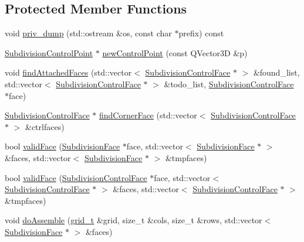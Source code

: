 \subsection*{Protected Member Functions}
\begin{DoxyCompactItemize}
\item 
void \hyperlink{classShipCAD_1_1SubdivisionSurface_a5c88eb988cc6a439242264bc54a6e3e1}{priv\-\_\-dump} (std\-::ostream \&os, const char $\ast$prefix) const 
\item 
\hyperlink{classShipCAD_1_1SubdivisionControlPoint}{Subdivision\-Control\-Point} $\ast$ \hyperlink{classShipCAD_1_1SubdivisionSurface_a251b711125d50aa51875451976e8a8d7}{new\-Control\-Point} (const Q\-Vector3\-D \&p)
\item 
void \hyperlink{classShipCAD_1_1SubdivisionSurface_a3163cfd01e0454ecb9dbb088dc76fbc6}{find\-Attached\-Faces} (std\-::vector$<$ \hyperlink{classShipCAD_1_1SubdivisionControlFace}{Subdivision\-Control\-Face} $\ast$ $>$ \&found\-\_\-list, std\-::vector$<$ \hyperlink{classShipCAD_1_1SubdivisionControlFace}{Subdivision\-Control\-Face} $\ast$ $>$ \&todo\-\_\-list, \hyperlink{classShipCAD_1_1SubdivisionControlFace}{Subdivision\-Control\-Face} $\ast$face)
\item 
\hyperlink{classShipCAD_1_1SubdivisionControlFace}{Subdivision\-Control\-Face} $\ast$ \hyperlink{classShipCAD_1_1SubdivisionSurface_a817d44176e659c2ccb4835d8240582db}{find\-Corner\-Face} (std\-::vector$<$ \hyperlink{classShipCAD_1_1SubdivisionControlFace}{Subdivision\-Control\-Face} $\ast$ $>$ \&ctrlfaces)
\item 
bool \hyperlink{classShipCAD_1_1SubdivisionSurface_a5b6204bb0648f2e85cbf07ffbac4bd42}{valid\-Face} (\hyperlink{classShipCAD_1_1SubdivisionFace}{Subdivision\-Face} $\ast$face, std\-::vector$<$ \hyperlink{classShipCAD_1_1SubdivisionFace}{Subdivision\-Face} $\ast$ $>$ \&faces, std\-::vector$<$ \hyperlink{classShipCAD_1_1SubdivisionFace}{Subdivision\-Face} $\ast$ $>$ \&tmpfaces)
\item 
bool \hyperlink{classShipCAD_1_1SubdivisionSurface_a9235b2787dfaaaa3d5f843c8046d1a9e}{valid\-Face} (\hyperlink{classShipCAD_1_1SubdivisionControlFace}{Subdivision\-Control\-Face} $\ast$face, std\-::vector$<$ \hyperlink{classShipCAD_1_1SubdivisionControlFace}{Subdivision\-Control\-Face} $\ast$ $>$ \&faces, std\-::vector$<$ \hyperlink{classShipCAD_1_1SubdivisionControlFace}{Subdivision\-Control\-Face} $\ast$ $>$ \&tmpfaces)
\item 
void \hyperlink{classShipCAD_1_1SubdivisionSurface_ac322d8008ea13bc3ca3fd1baeab7e1b3}{do\-Assemble} (\hyperlink{classShipCAD_1_1SubdivisionSurface_a69d4a3ca038ee247d0abcffa6125df95}{grid\-\_\-t} \&grid, size\-\_\-t \&cols, size\-\_\-t \&rows, std\-::vector$<$ \hyperlink{classShipCAD_1_1SubdivisionFace}{Subdivision\-Face} $\ast$ $>$ \&faces)

\end{DoxyCompactItemize}
